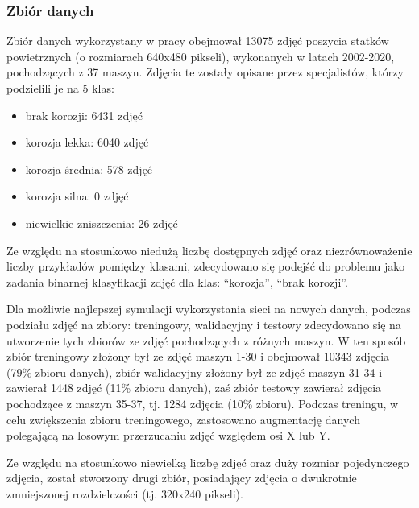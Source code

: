 \documentclass[polish,12pt]{aghthesis}
\begin{document}
\subsubsection{Zbiór danych}

\par\noindent Zbiór danych wykorzystany w pracy obejmował 13075 zdjęć poszycia statków powietrznych (o rozmiarach 640x480 pikseli), wykonanych w latach 2002-2020, pochodzących z 37 maszyn. Zdjęcia te zostały opisane przez specjalistów, którzy podzielili je na 5 klas:
\begin{itemize}
    \item brak korozji: 6431 zdjęć
    \item korozja lekka: 6040 zdjęć
    \item korozja średnia: 578 zdjęć
    \item korozja silna: 0 zdjęć
    \item niewielkie zniszczenia: 26 zdjęć
\end{itemize}
Ze względu na stosunkowo niedużą liczbę dostępnych zdjęć oraz niezrównoważenie liczby przykładów pomiędzy klasami, zdecydowano się podejść do problemu jako zadania binarnej klasyfikacji zdjęć dla klas: ``korozja'', ``brak korozji''.
\par Dla możliwie najlepszej symulacji wykorzystania sieci na nowych danych, podczas podziału zdjęć na zbiory: treningowy, walidacyjny i testowy zdecydowano się na utworzenie tych zbiorów ze zdjęć pochodzących z różnych maszyn. W ten sposób zbiór treningowy złożony był ze zdjęć maszyn 1-30 i obejmował 10343 zdjęcia (79\% zbioru danych), zbiór walidacyjny złożony był ze zdjęć maszyn 31-34 i zawierał 1448 zdjęć (11\% zbioru danych), zaś zbiór testowy zawierał zdjęcia pochodzące z maszyn 35-37, tj. 1284 zdjęcia (10\% zbioru). Podczas treningu, w celu zwiększenia zbioru treningowego, zastosowano augmentację danych polegającą na losowym przerzucaniu zdjęć względem osi X lub Y.
\par Ze względu na stosunkowo niewielką liczbę zdjęć oraz duży rozmiar pojedynczego zdjęcia, został stworzony drugi zbiór, posiadający zdjęcia o dwukrotnie zmniejszonej rozdzielczości (tj. 320x240 pikseli).
\end{document}
